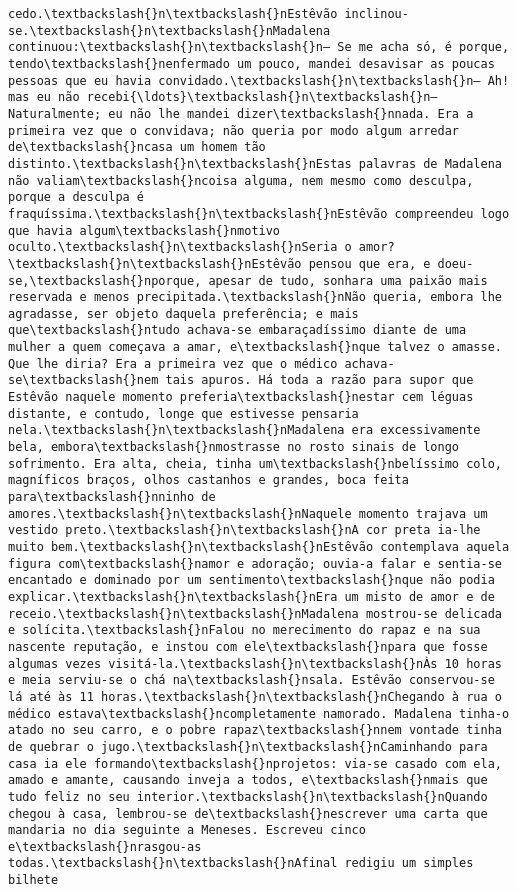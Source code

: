 \begin{Verbatim}[commandchars=\\\{\}]
cedo.\textbackslash{}n\textbackslash{}nEstêvão inclinou-se.\textbackslash{}n\textbackslash{}nMadalena continuou:\textbackslash{}n\textbackslash{}n— Se me acha só, é porque, tendo\textbackslash{}nenfermado um pouco, mandei desavisar as poucas pessoas que eu havia convidado.\textbackslash{}n\textbackslash{}n— Ah! mas eu não recebi{\ldots}\textbackslash{}n\textbackslash{}n— Naturalmente; eu não lhe mandei dizer\textbackslash{}nnada. Era a primeira vez que o convidava; não queria por modo algum arredar de\textbackslash{}ncasa um homem tão distinto.\textbackslash{}n\textbackslash{}nEstas palavras de Madalena não valiam\textbackslash{}ncoisa alguma, nem mesmo como desculpa, porque a desculpa é fraquíssima.\textbackslash{}n\textbackslash{}nEstêvão compreendeu logo que havia algum\textbackslash{}nmotivo oculto.\textbackslash{}n\textbackslash{}nSeria o amor?\textbackslash{}n\textbackslash{}nEstêvão pensou que era, e doeu-se,\textbackslash{}nporque, apesar de tudo, sonhara uma paixão mais reservada e menos precipitada.\textbackslash{}nNão queria, embora lhe agradasse, ser objeto daquela preferência; e mais que\textbackslash{}ntudo achava-se embaraçadíssimo diante de uma mulher a quem começava a amar, e\textbackslash{}nque talvez o amasse. Que lhe diria? Era a primeira vez que o médico achava-se\textbackslash{}nem tais apuros. Há toda a razão para supor que Estêvão naquele momento preferia\textbackslash{}nestar cem léguas distante, e contudo, longe que estivesse pensaria nela.\textbackslash{}n\textbackslash{}nMadalena era excessivamente bela, embora\textbackslash{}nmostrasse no rosto sinais de longo sofrimento. Era alta, cheia, tinha um\textbackslash{}nbelíssimo colo, magníficos braços, olhos castanhos e grandes, boca feita para\textbackslash{}nninho de amores.\textbackslash{}n\textbackslash{}nNaquele momento trajava um vestido preto.\textbackslash{}n\textbackslash{}nA cor preta ia-lhe muito bem.\textbackslash{}n\textbackslash{}nEstêvão contemplava aquela figura com\textbackslash{}namor e adoração; ouvia-a falar e sentia-se encantado e dominado por um sentimento\textbackslash{}nque não podia explicar.\textbackslash{}n\textbackslash{}nEra um misto de amor e de receio.\textbackslash{}n\textbackslash{}nMadalena mostrou-se delicada e solícita.\textbackslash{}nFalou no merecimento do rapaz e na sua nascente reputação, e instou com ele\textbackslash{}npara que fosse algumas vezes visitá-la.\textbackslash{}n\textbackslash{}nÀs 10 horas e meia serviu-se o chá na\textbackslash{}nsala. Estêvão conservou-se lá até às 11 horas.\textbackslash{}n\textbackslash{}nChegando à rua o médico estava\textbackslash{}ncompletamente namorado. Madalena tinha-o atado no seu carro, e o pobre rapaz\textbackslash{}nnem vontade tinha de quebrar o jugo.\textbackslash{}n\textbackslash{}nCaminhando para casa ia ele formando\textbackslash{}nprojetos: via-se casado com ela, amado e amante, causando inveja a todos, e\textbackslash{}nmais que tudo feliz no seu interior.\textbackslash{}n\textbackslash{}nQuando chegou à casa, lembrou-se de\textbackslash{}nescrever uma carta que mandaria no dia seguinte a Meneses. Escreveu cinco e\textbackslash{}nrasgou-as todas.\textbackslash{}n\textbackslash{}nAfinal redigiu um simples bilhete 
\end{Verbatim}
